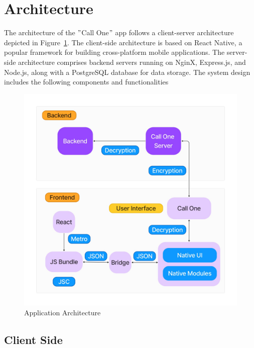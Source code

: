 \section{Architecture}\label{sec:architecture}
The architecture of the \("\)Call One\("\) app follows a client-server architecture depicted in Figure~\ref{fig:Application Architecture}.
The client-side architecture is based on React Native, a popular framework for building cross-platform mobile applications.
The server-side architecture comprises backend servers running on NginX, Express.js, and Node.js, along with a PostgreSQL database for data storage.
The system design includes the following components and functionalities

\begin{figure}
    \centering
    \includegraphics[width=1\linewidth]{Media/arch}
    \caption{Application Architecture}
    \label{fig:Application Architecture}
\end{figure}


\subsection{Client Side}\label{subsec:client-side}

